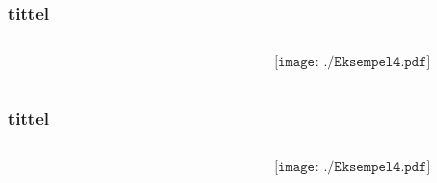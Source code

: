 \documentclass[aspectratio=169,xcolor=dvipsnames]{beamer}
\begin{document}
\begin{frame} \frametitle{tittel}
	\begin{columns}
		\begin{column}{0.5\textwidth}
			
		\end{column}
		\begin{column}{0.5\textwidth}
			$$\texttt{[image: ./Eksempel4.pdf]}$$
		\end{column}
	\end{columns}
\end{frame}

\begin{frame} \frametitle{tittel}
	\begin{columns}
		\begin{column}{0.5\textwidth}
			
		\end{column}
		\begin{column}{0.5\textwidth}
			$$\texttt{[image: ./Eksempel4.pdf]}$$
		\end{column}
	\end{columns}
\end{frame}
\end{document}
